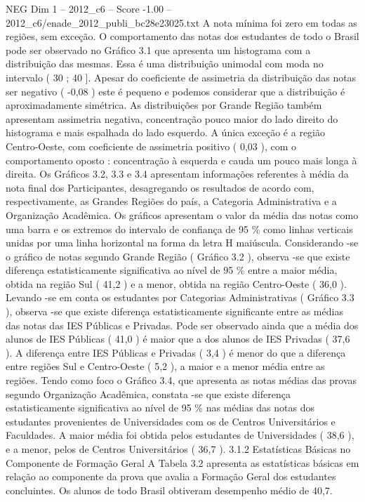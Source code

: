 \begin{textsample}{NEG Dim 1 – 2012\_c6 – Score -1.00 – 2012\_c6/enade\_2012\_publi\_bc28e23025.txt}
A nota mínima foi zero em todas as regiões, sem exceção.
O comportamento das notas dos estudantes de todo o Brasil pode ser observado no Gráfico 3.1 que apresenta um histograma com a distribuição das mesmas.
Essa é uma distribuição unimodal com moda no intervalo ( 30 ; 40 ].
Apesar do coeficiente de assimetria da distribuição das notas ser negativo ( -0,08 ) este é pequeno e podemos considerar que a distribuição é aproximadamente simétrica.
As distribuições por Grande Região também apresentam assimetria negativa, concentração pouco maior do lado direito do histograma e mais espalhada do lado esquerdo.
A única exceção é a região Centro-Oeste, com coeficiente de assimetria positivo ( 0,03 ), com o comportamento oposto : concentração à esquerda e cauda um pouco mais longa à direita.
Os Gráficos 3.2, 3.3 e 3.4 apresentam informações referentes à média da nota final dos Participantes, desagregando os resultados de acordo com, respectivamente, as Grandes Regiões do país, a Categoria Administrativa e a Organização Acadêmica.
Os gráficos apresentam o valor da média das notas como uma barra e os extremos do intervalo de confiança de 95 \% como linhas verticais unidas por uma linha horizontal na forma da letra H maiúscula.
Considerando -se o gráfico de notas segundo Grande Região ( Gráfico 3.2 ), observa -se que existe diferença estatisticamente significativa ao nível de 95 \% entre a maior média, obtida na região Sul ( 41,2 ) e a menor, obtida na região Centro-Oeste ( 36,0 ).
Levando -se em conta os estudantes por Categorias Administrativas ( Gráfico 3.3 ), observa -se que existe diferença estatisticamente significante entre as médias das notas das IES Públicas e Privadas.
Pode ser observado ainda que a média dos alunos de IES Públicas ( 41,0 ) é maior que a dos alunos de IES Privadas ( 37,6 ).
A diferença entre IES Públicas e Privadas ( 3,4 ) é menor do que a diferença entre regiões Sul e Centro-Oeste ( 5,2 ), a maior e a menor média entre as regiões.
Tendo como foco o Gráfico 3.4, que apresenta as notas médias das provas segundo Organização Acadêmica, constata -se que existe diferença estatisticamente significativa ao nível de 95 \% nas médias das notas dos estudantes provenientes de Universidades com os de Centros Universitários e Faculdades.
A maior média foi obtida pelos estudantes de Universidades ( 38,6 ), e a menor, pelos de Centros Universitários ( 36,7 ). 3.1.2 Estatísticas Básicas no Componente de Formação Geral A Tabela 3.2 apresenta as estatísticas básicas em relação ao componente da prova que avalia a Formação Geral dos estudantes concluintes.
Os alunos de todo Brasil obtiveram desempenho médio de 40,7.

\end{textsample}

